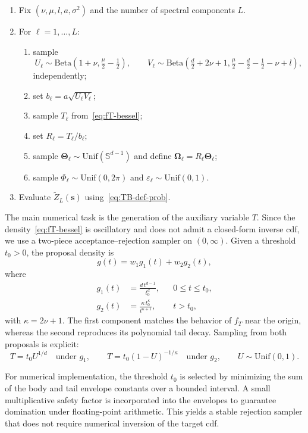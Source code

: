 \documentclass[
  12pt]{article}
\begin{document}
\begin{enumerate}
\item Fix $(\nu,\mu,l,a,\sigma^2)$ and the number of spectral components $L$.
\item For $\ell=1,\ldots,L$:
\begin{enumerate}
\item sample
\[
U_\ell \sim \mathrm{Beta}\!\left(1+\nu,\tfrac{\mu}{2}-\tfrac12\right),
\qquad
V_\ell \sim \mathrm{Beta}\!\left(\tfrac d2+2\nu+1,\tfrac{\mu}{2}-\tfrac d2-\tfrac12-\nu+l\right),
\]
independently;
\item set $b_\ell=a\sqrt{U_\ell V_\ell}$;
\item sample $T_\ell$ from~\eqref{eq:fT-bessel};
\item set $R_\ell=T_\ell/b_\ell$;
\item sample $\boldsymbol{\Theta}_\ell\sim\mathrm{Unif}(\mathbb{S}^{d-1})$ and define $\boldsymbol{\Omega}_\ell=R_\ell\boldsymbol{\Theta}_\ell$;
\item sample $\Phi_\ell\sim\mathrm{Unif}(0,2\pi)$ and $\varepsilon_\ell\sim\mathrm{Unif}(0,1)$.
\end{enumerate}
\item Evaluate $\widetilde Z_L(\mathbf{s})$ using~\eqref{eq:TB-def-prob}.
\end{enumerate}

The main numerical task is the generation of the auxiliary variable $T$.
Since the density~\eqref{eq:fT-bessel} is oscillatory and does not admit a closed-form inverse cdf, we use a two-piece acceptance--rejection sampler on $(0,\infty)$.
Given a threshold $t_0>0$, the proposal density is
\[
g(t)=w_1 g_1(t)+w_2 g_2(t),
\]
where
\begin{align}
g_1(t) &= \frac{d\,t^{d-1}}{t_0^d}, && 0\le t\le t_0,\\
g_2(t) &= \frac{\kappa\,t_0^\kappa}{t^{\kappa+1}}, && t>t_0,
\end{align}
with
$
\kappa=2\nu+1.
$
The first component matches the behavior of $f_T$ near the origin, whereas the second reproduces its polynomial tail decay. Sampling from both proposals is explicit:
\[
T=t_0U^{1/d}\quad\text{under }g_1,
\qquad
T=t_0(1-U)^{-1/\kappa}\quad\text{under }g_2,
\qquad U\sim\mathrm{Unif}(0,1).
\]

For numerical implementation, the threshold $t_0$ is selected by minimizing the sum of the body and tail envelope constants over a bounded interval.
A small multiplicative safety factor is incorporated into the envelopes to guarantee domination under floating-point arithmetic.
This yields a stable rejection sampler that does not require numerical inversion of the target cdf.
\end{document}
